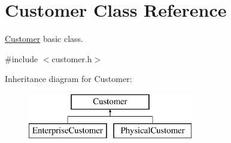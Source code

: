 \hypertarget{class_customer}{\section{\-Customer \-Class \-Reference}
\label{class_customer}
}


\hyperlink{class_customer}{\-Customer} basic class.  




{\ttfamily \#include $<$customer.\-h$>$}

\-Inheritance diagram for \-Customer\-:\begin{figure}[H]
\begin{center}
\leavevmode
\includegraphics[height=2.000000cm]{class_customer}
\end{center}
\end{figure}
